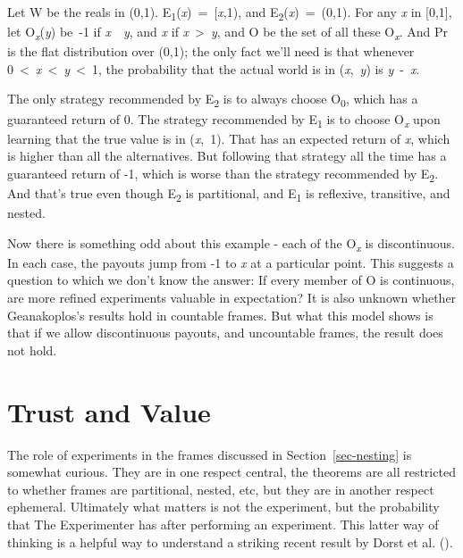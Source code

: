\documentclass[
  10pt,
  letterpaper,
  DIV=11,
  numbers=noendperiod,
  twoside]{scrartcl}
\begin{document}
Let W be the reals in (0,1).
E\textsubscript{1}(\emph{x})~=~{[}\emph{x},1), and
E\textsubscript{2}(\emph{x})~=~(0,1). For any \emph{x} in {[}0,1{]}, let
O\textsubscript{\emph{x}}(\emph{y}) be~-1 if \emph{x}~\geq~\emph{y}, and
\emph{x} if \emph{x}~\textgreater~\emph{y}, and O be the set of all
these O\textsubscript{\emph{x}}. And Pr is the flat distribution over
(0,1); the only fact we'll need is that whenever
0~\textless~\emph{x}~\textless~\emph{y}~\textless~1, the probability
that the actual world is in (\emph{x},~\emph{y}) is \emph{y}~-~\emph{x}.

The only strategy recommended by E\textsubscript{2} is to always choose
O\textsubscript{0}, which has a guaranteed return of 0. The strategy
recommended by E\textsubscript{1} is to choose O\textsubscript{\emph{x}}
upon learning that the true value is in (\emph{x},~1). That has an
expected return of \emph{x}, which is higher than all the alternatives.
But following that strategy all the time has a guaranteed return of -1,
which is worse than the strategy recommended by E\textsubscript{2}. And
that's true even though E\textsubscript{2} is partitional, and
E\textsubscript{1} is reflexive, transitive, and nested.

Now there is something odd about this example - each of the
O\textsubscript{\emph{x}} is discontinuous. In each case, the payouts
jump from -1 to \emph{x} at a particular point. This suggests a question
to which we don't know the answer: If every member of O is continuous,
are more refined experiments valuable in expectation? It is also unknown
whether Geanakoplos's results hold in countable frames. But what this
model shows is that if we allow discontinuous payouts, and uncountable
frames, the result does not hold.

\section{Trust and Value}\label{sec-dorst}

The role of experiments in the frames discussed in
Section~\ref{sec-nesting} is somewhat curious. They are in one respect
central, the theorems are all restricted to whether frames are
partitional, nested, etc, but they are in another respect ephemeral.
Ultimately what matters is not the experiment, but the probability that
The Experimenter has after performing an experiment. This latter way of
thinking is a helpful way to understand a striking recent result by
Dorst et al. ().
\end{document}
